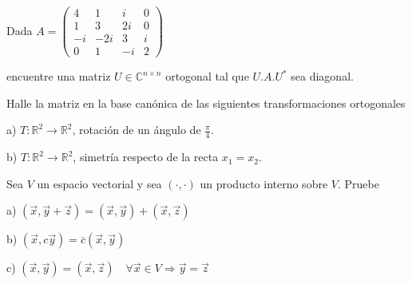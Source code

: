 {\begin{exercise}
 
 

\end{exercise}

\newpage

\begin{exercise}
\item 


Dada 
$A=\left(\begin{array}{cccc}4 &1 & i & 0    \\ 1 & 3 & 2i
&0 \\ -i  & -2i & 3  & i \\0 & 1 &-i & 2                         
\end{array}
 \right)$

 \bigskip
 

\noindent encuentre una matriz $U \in \mathbb{C}^{n \times n}$  ortogonal tal que $U.A.U^*$ sea diagonal.
\end{exercise}
\begin{exercise}
\item

Halle la matriz en la base canónica de las siguientes transformaciones ortogonales

a)  $T:\mathbb{R}^2 \rightarrow \mathbb{R}^2$, rotación de un ángulo de $\frac {\pi}{4}$.


b)  $T:\mathbb{R}^2 \rightarrow \mathbb{R}^2$, simetría respecto de la recta $x_1=x_2$.

\end{exercise}

\bigskip

 
 \bigskip

\begin{exercise} 
\item

Sea $V$ un espacio vectorial y sea $(\cdot,\cdot)$ un producto interno sobre $V$. Pruebe

a) $( \Vec{x}, \Vec{y}+\Vec{z})= ( \Vec{x}, \Vec{y} ) +( \Vec{x}, \Vec{z} )$


b) $( \Vec{x}, c\Vec{y} )= \overline c ( \Vec{x}, \Vec{y} )$

c) $( \Vec{x}, \Vec{y})=  (\Vec{x},\Vec{z} )  \quad  \forall \Vec{x} \in V  \Rightarrow \Vec{y}=\Vec{z}$
\end{exercise}

}
